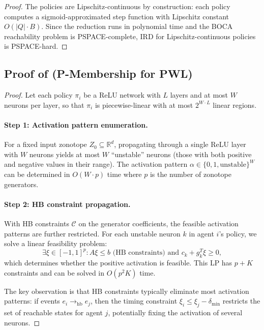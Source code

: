 \documentclass[11pt]{article}
\newcommand{\R}{\mathbb{R}}
\newcommand{\calC}{\mathcal{C}}
\newcommand{\hb}{\rightarrow_{\mathrm{hb}}}
\begin{document}
\begin{proof}
The policies are Lipschitz-continuous by construction: each policy
computes a sigmoid-approximated step function with Lipschitz constant
$O(|Q| \cdot B)$.
Since the reduction runs in polynomial time and the BOCA reachability
problem is PSPACE-complete, IRD for Lipschitz-continuous policies is
PSPACE-hard.
\end{proof}


\subsection{Proof of \texorpdfstring{}{Theorem 2.4} (P-Membership for PWL)}
\label{app:pwl-proof}

\begin{proof}
Let each policy $\pi_i$ be a ReLU network with $L$ layers and at most $W$
neurons per layer, so that $\pi_i$ is piecewise-linear with at most
$2^{W \cdot L}$ linear regions.

\paragraph{Step 1: Activation pattern enumeration.}
For a fixed input zonotope $Z_0 \subseteq \R^d$, propagating through a single
ReLU layer with $W$ neurons yields at most $W$ ``unstable'' neurons (those
with both positive and negative values in their range). The activation pattern
$\alpha \in \{0, 1, \text{unstable}\}^W$ can be determined in $O(W \cdot p)$
time where $p$ is the number of zonotope generators.

\paragraph{Step 2: HB constraint propagation.}
With HB constraints $\calC$ on the generator coefficients, the feasible
activation patterns are further restricted. For each unstable neuron $k$
in agent $i$'s policy, we solve a linear feasibility problem:
\[
  \exists \xi \in [-1,1]^p : A\xi \leq b \text{ (HB constraints) and }
  c_k + g_k^T \xi \geq 0,
\]
which determines whether the positive activation is feasible. This LP has
$p + K$ constraints and can be solved in $O(p^2 K)$ time.

The key observation is that HB constraints typically eliminate most
activation patterns: if events $e_i \hb e_j$, then the timing constraint
$\xi_i \leq \xi_j - \delta_{\min}$ restricts the set of reachable states
for agent $j$, potentially fixing the activation of several neurons.


\end{proof}
\end{document}
